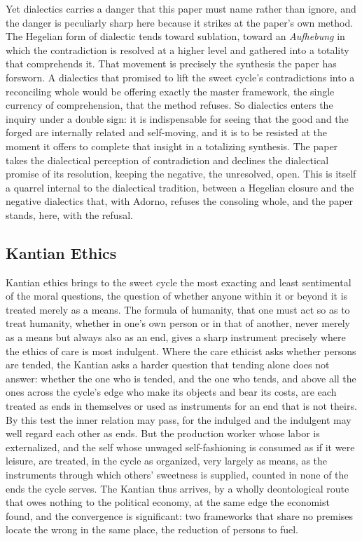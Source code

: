 Yet dialectics carries a danger that this paper must name rather than ignore, and the danger is peculiarly sharp here because it strikes at the paper's own method. The Hegelian form of dialectic tends toward sublation, toward an \textit{Aufhebung} in which the contradiction is resolved at a higher level and gathered into a totality that comprehends it. That movement is precisely the synthesis the paper has forsworn. A dialectics that promised to lift the sweet cycle's contradictions into a reconciling whole would be offering exactly the master framework, the single currency of comprehension, that the method refuses. So dialectics enters the inquiry under a double sign: it is indispensable for seeing that the good and the forged are internally related and self-moving, and it is to be resisted at the moment it offers to complete that insight in a totalizing synthesis. The paper takes the dialectical perception of contradiction and declines the dialectical promise of its resolution, keeping the negative, the unresolved, open. This is itself a quarrel internal to the dialectical tradition, between a Hegelian closure and the negative dialectics that, with Adorno, refuses the consoling whole, and the paper stands, here, with the refusal.

\subsection{Kantian Ethics}

Kantian ethics brings to the sweet cycle the most exacting and least sentimental of the moral questions, the question of whether anyone within it or beyond it is treated merely as a means. The formula of humanity, that one must act so as to treat humanity, whether in one's own person or in that of another, never merely as a means but always also as an end, gives a sharp instrument precisely where the ethics of care is most indulgent. Where the care ethicist asks whether persons are tended, the Kantian asks a harder question that tending alone does not answer: whether the one who is tended, and the one who tends, and above all the ones across the cycle's edge who make its objects and bear its costs, are each treated as ends in themselves or used as instruments for an end that is not theirs. By this test the inner relation may pass, for the indulged and the indulgent may well regard each other as ends. But the production worker whose labor is externalized, and the self whose unwaged self-fashioning is consumed as if it were leisure, are treated, in the cycle as organized, very largely as means, as the instruments through which others' sweetness is supplied, counted in none of the ends the cycle serves. The Kantian thus arrives, by a wholly deontological route that owes nothing to the political economy, at the same edge the economist found, and the convergence is significant: two frameworks that share no premises locate the wrong in the same place, the reduction of persons to fuel.

